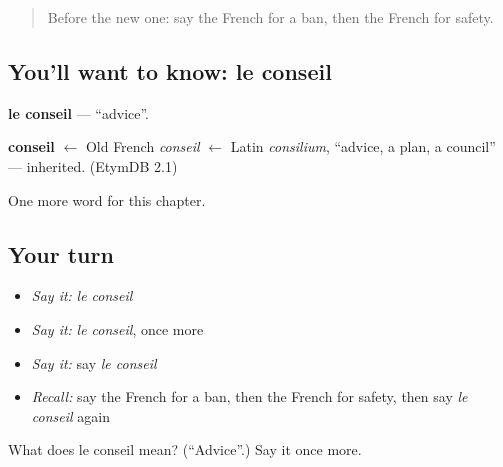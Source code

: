\begin{quote}
Before the new one: say the French for a ban, then the French for safety.
\end{quote}

\subsection*{You'll want to know: le conseil}
\textbf{le conseil} — \textquotedblleft{}advice\textquotedblright{}.

\begin{cousinweb}
\textbf{conseil} $\leftarrow$ Old French \emph{conseil} $\leftarrow$ Latin \emph{consilium}, \textquotedblleft{}advice, a plan, a council\textquotedblright{} — inherited. (EtymDB 2.1)
\end{cousinweb}

\begin{grammarlens}[title={What you've built}]
One more word for this chapter.
\end{grammarlens}

\subsection*{Your turn}
\begin{itemize}
\raggedright
  \item \emph{Say it:} \emph{le conseil}
  \item \emph{Say it:} \emph{le conseil}, once more
  \item \emph{Say it:} say \emph{le conseil}
  \item \emph{Recall:} say the French for a ban, then the French for safety, then say \emph{le conseil} again
\end{itemize}

\begin{tcolorbox}[breakable,colback=teal!4,colframe=teal!35!black,title={Before you move on}]
What does le conseil mean? (\textquotedblleft{}Advice\textquotedblright{}.) Say it once more.
\end{tcolorbox}
